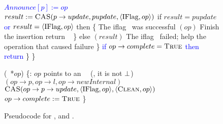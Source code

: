 \begin{figure*}
\begin{code}
		\textcolor{blue}{$Announce[p] := op$} \nlc
		$result := \mbox{\sc CAS}(p\rightarrow update, pupdate, \langle \mbox{IFlag}, op\rangle)$ \label{iflag-cas} \nlc
		if $result = pupdate$ \textcolor{blue}{or $result = \langle \mbox{IFlag},op \rangle$} then \{ \tabtabcom The iflag \CASB\ was successful\nlc
		\n            {}$(op)$ \tabtabcom Finish the insertion\label{finish-insert}\nlc
		return \TRUE\ \label{insert-true}\nlc
		\p        \}\nlc 
		else $(result)$ \tabcom The iflag \CASB\ failed; help the operation that caused failure\label{ins-help-after-failure}\nlc
		\p    \}\nlc
		\textcolor{blue}{if $op \rightarrow complete = \mbox{\sc True}$ then} \nlc
		\n		\textcolor{blue}{return \TRUE} \nlc \p
		\p\}\nlc 
		\p
		\}\bl
		\nlc
		
		(\IFlag\ *$op$) \{\ul
		\n     {}:  $op$ points to an \IFlag\ \record\  (\ie, it is not $\mbox{$\bot$}$)\nlc
		$(op\rightarrow p, op\rightarrow l, op\rightarrow newInternal)$ \label{ichild-cas}\nlc
		$\mbox{\sc CAS}(op\rightarrow p\rightarrow update, \langle \mbox{IFlag}, op \rangle, \langle \mbox{\sc Clean}, op\rangle)$  \label{iunflag-cas}\nlc
		\textcolor{blue}{$op \rightarrow complete := \mbox{\sc True}$} \nlc 
		\p
		\}
	\end{code}
	\caption{\label{code2}Pseudocode for ,  and .}
\end{figure*}

